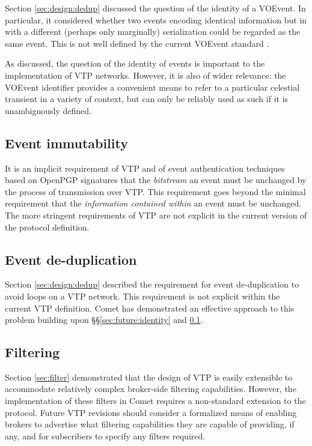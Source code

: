 \documentclass[5p,authoryear]{elsarticle}
\begin{document}
Section \ref{sec:design:dedup} discussed the question of the identity of a
VOEvent. In particular, it considered whether two events encoding identical
information but in with a different (perhaps only marginally) serialization
could be regarded as the same event. This is not well defined by the current
VOEvent standard \citep{Seaman:2011}.

As discussed, the question of the identity of events is important to the
implementation of VTP networks. However, it is also of wider relevance: the
VOEvent identifier provides a convenient means to refer to a particular
celestial transient in a variety of context, but can only be reliably used as
such if it is unambiguously defined.

\subsection{Event immutability}
\label{sec:future:immutability}

It is an implicit requirement of VTP and of event authentication techniques
based on OpenPGP signatures that the \textit{bitstream} an event must be
unchanged by the process of transmission over VTP. This requirement goes
beyond the minimal requirement that the \textit{information contained within}
an event must be unchanged. The more stringent requirements of VTP are not
explicit in the current version of the protocol definition.

\subsection{Event de-duplication}
\label{sec:future:dedup}

Section \ref{sec:design:dedup} described the requirement for event
de-duplication to avoid loops on a VTP network. This requirement is not
explicit within the current VTP definition. Comet has demonstrated an
effective approach to this problem building upon \S\S\ref{sec:future:identity}
and \ref{sec:future:immutability}.

\subsection{Filtering}
\label{sec:future:filter}

Section \ref{sec:filter} demonstrated that the design of VTP is easily
extensible to accommodate relatively complex broker-side filtering
capabilities. However, the implementation of these filters in Comet requires a
non-standard extension to the protocol. Future VTP revisions should consider a
formalized means of enabling brokers to advertise what filtering capabilities
they are capable of providing, if any, and for subscribers to specify any
filters required.
\end{document}

